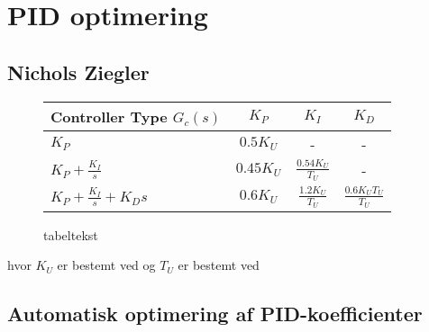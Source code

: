 \section{PID optimering}
\label{sec:PID}
\subsection{Nichols Ziegler}


\begin{figure}[th!]
\centering
\begin{tabular}{l|c|c|c}
Controller Type \({ G }_{ c }\left( s \right)\) & \(K_P\) & \(K_I\) & \(K_D\)\\\hline
\({ K }_{ P } \)& \(0.5  { K }_{ U }\) &-&-\\
\({ K }_{ P }+\frac { { K }_{ I } }{ s } \) & \(0.45  { K }_{ U }\) & \( \frac { 0.54  { K }_{ U } }{ { T }_{ U } }  \) &-\\
\({ K }_{ P }+\frac { { K }_{ I } }{ s } +{ K }_{ D }   s\) & \(0.6  { K }_{ U } \) &  \( \frac { 1.2  { K }_{ U } }{ { T }_{ U } }  \) & \(\frac { 0.6  { K }_{ U }  { T }_{ U } }{ { T }_{ U } }  \)
\end{tabular}
\captionsetup{type=table}
\caption[tekst i indholdsfortegnelsen]{tabeltekst}
\label{tb:}
\end{figure}

hvor \(K_U\) er bestemt ved og \(T_U\) er bestemt ved





\subsection{Automatisk optimering af PID-koefficienter}